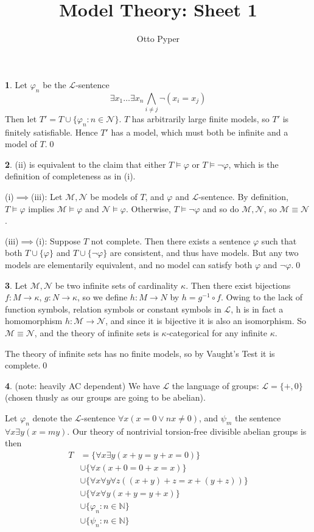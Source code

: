 \documentclass[]{article}
\title{Model Theory: Sheet 1}
\author{Otto Pyper}
\date{}
\theoremstyle{custhm}
\theoremstyle{cusdef}
\theoremstyle{custhm}
\theoremstyle{custhm}
\theoremstyle{custhm}
\theoremstyle{custhm}
\theoremstyle{cusdef}
\theoremstyle{remark}
\newcommand{\N}{\mathcal{N}}
\newcommand{\ra}{\rightarrow}
\renewcommand{\L}{\mathcal{L}}
\newcommand{\M}{\mathcal{M}}
\renewcommand{\phi}{\varphi}
\begin{document}
\maketitle
\clearpage

\textbf{1}. Let $\phi_n$ be the $\L$-sentence
\[
\exists x_1\dots\exists x_n \bigwedge_{i\ne j}\neg(x_i=x_j)
\]
Then let $T' = T\cup\{\phi_n:n\in\N\}$. $T$ has arbitrarily large finite models, so $T'$ is finitely satisfiable. Hence $T'$ has a model, which must both be infinite and a model of $T$.\qed

\textbf{2}. (ii) is equivalent to the claim that either $T\models \phi$ or $T\models\neg\phi$, which is the definition of completeness as in (i).

(i)$\implies$(iii): Let $\M,\mathcal{N}$ be models of $T$, and $\phi$ and $\L$-sentence. By definition, $T\models\phi$ implies $\M\models\phi$ and $\N\models \phi$. Otherwise, $T\models\neg\phi$ and so do $\M,\N$, so $\M\equiv\N$.

(iii)$\implies$(i): Suppose $T$ not complete. Then there exists a sentence $\phi$ such that both $T\cup\{\phi\}$ and $T\cup\{\neg\phi\}$ are consistent, and thus have models. But any two models are elementarily equivalent, and no model can satisfy both $\phi$ and $\neg\phi$.\qed

\textbf{3}. Let $\M,\N$ be two infinite sets of cardinality $\kappa$. Then there exist bijections $f:M\ra\kappa$, $g:N\ra\kappa$, so we define $h:M\ra N$ by $h = g^{-1}\circ f$. Owing to the lack of function symbols, relation symbols or constant symbols in $\L$, h is in fact a homomorphism $h:\M\ra\N$, and since it is bijective it is also an isomorphism. So $\M\equiv \N$, and the theory of infinite sets is $\kappa$-categorical for any infinite $\kappa$.

The theory of infinite sets has no finite models, so by Vaught's Test it is complete.\qed

\textbf{4}. (note: heavily AC dependent) We have $\L$ the language of groups: $\L = \{+,0\}$ (chosen thusly as our groups are going to be abelian).

Let $\phi_n$ denote the $\L$-sentence $\forall x (x=0\lor nx\neq 0)$, and $\psi_m$ the sentence $\forall x\exists y(x=my)$. Our theory of nontrivial torsion-free divisible abelian groups is then
\begin{align*}
T &= \{\forall x\exists y (x+y = y+x = 0)\}\\
&\cup\{\forall x(x+0=0+x=x)\}\\
&\cup\{\forall x\forall y\forall z ((x+y)+z = x + (y+z))\}\\
&\cup\{ \forall x\forall y (x+y = y+x) \}\\
&\cup\{\phi_n:n\in\mathbb{N}\}\\
&\cup\{\psi_n:n\in\mathbb{N}\}
\end{align*}
\end{document}
